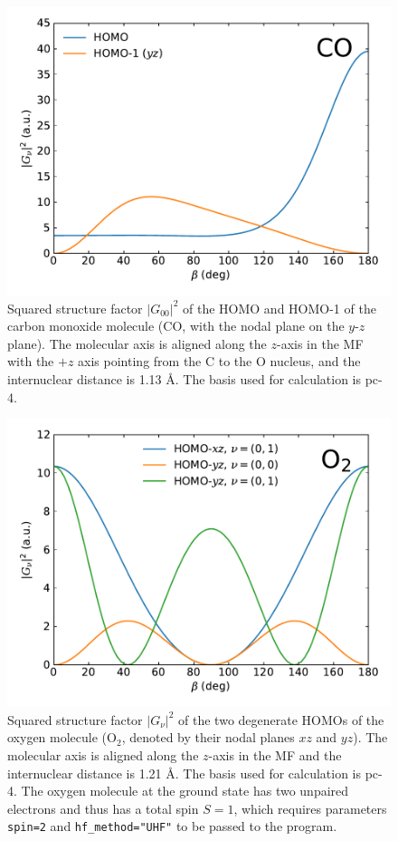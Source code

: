 \documentclass[preprint,12pt]{elsarticle} %
\renewcommand{\rm}[1]{\mathrm{#1}}    %
\newcommand{\abs}[1]{\lvert #1 \rvert}  %
\begin{document}
\begin{figure}
    \centering
    \includegraphics[width=\columnwidth]{CO_Example_sub_20230225.pdf}
    \caption{Squared structure factor $\abs{G_{00}}^2$ of the HOMO and HOMO-1 of the carbon monoxide molecule ($\rm{CO}$, with the nodal plane on the $y$-$z$ plane). The molecular axis is aligned along the $z$-axis in the MF with the $+z$ axis pointing from the C to the O nucleus, and the internuclear distance is 1.13 \r{A}. The basis used for calculation is pc-4.}
    \label{fig:example_CO}
\end{figure}

\begin{figure}
    \centering
    \includegraphics[width=\columnwidth]{O2_Example_sub_20230225.pdf}
    \caption{Squared structure factor $\abs{G_\nu}^2$ of the two degenerate HOMOs of the oxygen molecule ($\rm{O}_2$, denoted by their nodal planes $xz$ and $yz$). The molecular axis is aligned along the $z$-axis in the MF and the internuclear distance is 1.21 \r{A}. The basis used for calculation is pc-4. The oxygen molecule at the ground state has two unpaired electrons and thus has a total spin $S=1$, which requires parameters \texttt{spin=2} and \texttt{hf\_method="UHF"} to be passed to the program.}
    \label{fig:example_O2}
\end{figure}
\end{document}
